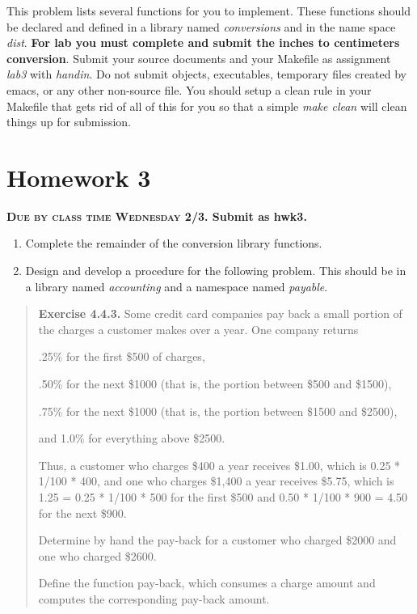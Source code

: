 \documentclass[]{tufte-handout}
\begin{document}
This problem lists several functions for you to implement. These functions should be declared and defined in a library named \textit{conversions} and in the name space \textit{dist}. \textbf{For lab you must complete and submit the inches to centimeters conversion}. Submit your source documents and your Makefile as assignment \textit{lab3} with \textit{handin}.  Do not submit objects, executables, temporary files created by emacs, or any other non-source file. You should setup a clean rule in your Makefile that gets rid of all of this for you so that a simple \textit{make clean} will clean things up for submission.

\newpage

\section{Homework 3}

\begin{center}
\textbf{\textsc{Due by class time Wednesday 2/3}. Submit as hwk3.}
\end{center}

\begin{enumerate}
\item Complete the remainder of the conversion library functions.
\item Design and develop a procedure for the following problem. This should be in a library named \textit{accounting} and a namespace named \textit{payable}.
\end{enumerate}

\begin{framed}
\begin{quote}
\textbf{Exercise 4.4.3.}   Some credit card companies pay back a small portion of the charges a customer makes over a year. One company returns

.25\% for the first \$500 of charges,

.50\% for the next \$1000 (that is, the portion between \$500 and \$1500),

.75\% for the next \$1000 (that is, the portion between \$1500 and \$2500),

and 1.0\% for everything above \$2500.

Thus, a customer who charges \$400 a year receives \$1.00, which is 0.25 * 1/100 * 400, and one who charges \$1,400 a year receives \$5.75, which is 1.25 = 0.25 * 1/100 * 500 for the first \$500 and 0.50 * 1/100 * 900 = 4.50 for the next \$900.

Determine by hand the pay-back for a customer who charged \$2000 and one who charged \$2600.

Define the function pay-back, which consumes a charge amount and computes the corresponding pay-back amount.
\end{quote}
\end{framed}
\end{document}
